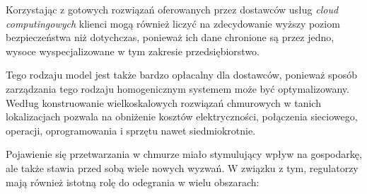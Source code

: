 \documentclass[12pt,a4paper,twoside]{article}
\begin{document}
Korzystając z gotowych rozwiązań oferowanych przez dostawców usług \textit{cloud computingowych} klienci mogą również liczyć na zdecydowanie wyższy poziom bezpieczeństwa niż dotychczas, ponieważ ich dane chronione są przez jedno, wysoce wyspecjalizowane w tym zakresie przedsiębiorstwo.

Tego rodzaju model jest także bardzo opłacalny dla dostawców, ponieważ sposób zarządzania tego rodzaju homogenicznym systemem może być optymalizowany. Według \citet{baun2011} konstruowanie wielkoskalowych rozwiązań chmurowych w tanich lokalizacjach pozwala na obniżenie kosztów elektryczności, połączenia sieciowego, operacji, oprogramowania i sprzętu nawet siedmiokrotnie.

Pojawienie się przetwarzania w chmurze miało stymulujący wpływ na gospodarkę, ale także stawia przed sobą wiele nowych wyzwań. W związku z tym, regulatorzy mają również istotną rolę do odegrania w wielu obszarach:
\end{document}
